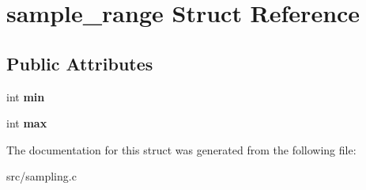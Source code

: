 \hypertarget{structsample__range}{}\section{sample\+\_\+range Struct Reference}
\label{structsample__range}
\subsection*{Public Attributes}
\begin{DoxyCompactItemize}
\item 
\hypertarget{structsample__range_aec99a7b0ac9b940beae0e294c5a662c5}{}int {\bfseries min}\label{structsample__range_aec99a7b0ac9b940beae0e294c5a662c5}

\item 
\hypertarget{structsample__range_ac6d139bddb95ce94fea09eabcf9dfa8d}{}int {\bfseries max}\label{structsample__range_ac6d139bddb95ce94fea09eabcf9dfa8d}

\end{DoxyCompactItemize}


The documentation for this struct was generated from the following file\+:\begin{DoxyCompactItemize}
\item 
src/sampling.\+c\end{DoxyCompactItemize}
